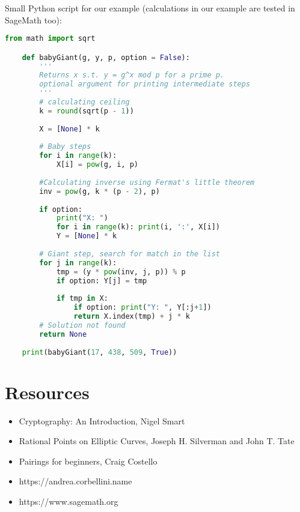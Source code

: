 \documentclass[fleqn,10pt]{olplainarticle}
\begin{document}
Small Python script for our example (calculations in our 
example are tested in SageMath too):
\begin{lstlisting}[language=Python]
    from math import sqrt

    def babyGiant(g, y, p, option = False):
        '''
        Returns x s.t. y = g^x mod p for a prime p.
        optional argument for printing intermediate steps
        '''
        # calculating ceiling
        k = round(sqrt(p - 1))
    
        X = [None] * k
    
        # Baby steps
        for i in range(k):
            X[i] = pow(g, i, p)
        
        #Calculating inverse using Fermat's little theorem
        inv = pow(g, k * (p - 2), p)
        
        if option:
            print("X: ")
            for i in range(k): print(i, ':', X[i])
            Y = [None] * k
            
        # Giant step, search for match in the list
        for j in range(k):
            tmp = (y * pow(inv, j, p)) % p
            if option: Y[j] = tmp
    
            if tmp in X:
                if option: print("Y: ", Y[:j+1])
                return X.index(tmp) + j * k 
        # Solution not found
        return None
    
    print(babyGiant(17, 438, 509, True))
\end{lstlisting}

\section*{Resources}

\begin{itemize}[noitemsep] 
    \item Cryptography: An Introduction, Nigel Smart 
    \item  Rational Points on Elliptic Curves, Joseph H. Silverman and 
    John T. Tate
    \item Pairings for beginners, Craig Costello
    \item https://andrea.corbellini.name
    \item https://www.sagemath.org
\end{itemize}
\end{document}
